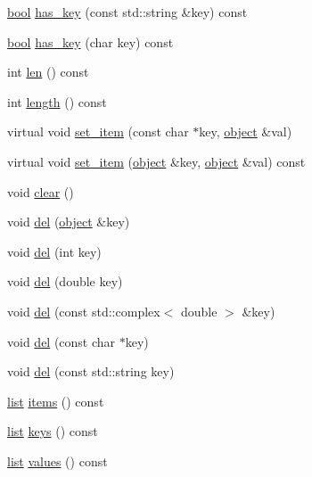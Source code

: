 \begin{DoxyCompactItemize}
\item 
\hyperlink{compiler_8h_abb452686968e48b67397da5f97445f5b}{bool} \hyperlink{classpy_1_1dict_a1e93fb561965cccdf7720a3069c008d0}{has\+\_\+key} (const std\+::string \&key) const 
\item 
\hyperlink{compiler_8h_abb452686968e48b67397da5f97445f5b}{bool} \hyperlink{classpy_1_1dict_a9a29698e309eaac8811f7fa0eb6f589d}{has\+\_\+key} (char key) const 
\item 
int \hyperlink{classpy_1_1dict_af1f58cca1f270397349855b84d4df5fc}{len} () const 
\item 
int \hyperlink{classpy_1_1dict_a7557aa3c212cf55ecac869823f912295}{length} () const 
\item 
virtual void \hyperlink{classpy_1_1dict_aa632b88577839a9cb10fa1625173df08}{set\+\_\+item} (const char $\ast$key, \hyperlink{classpy_1_1object}{object} \&val)
\item 
virtual void \hyperlink{classpy_1_1dict_a9c84f88fdc3f1c9b51ee6af4710aaf0f}{set\+\_\+item} (\hyperlink{classpy_1_1object}{object} \&key, \hyperlink{classpy_1_1object}{object} \&val) const 
\item 
void \hyperlink{classpy_1_1dict_ac25bf8117c03ba21e3a20d040215b419}{clear} ()
\item 
void \hyperlink{classpy_1_1dict_a4e78252d83960c47c4697fa6ceb05351}{del} (\hyperlink{classpy_1_1object}{object} \&key)
\item 
void \hyperlink{classpy_1_1dict_ae16a6626cbf8a367d3036a1bee641c62}{del} (int key)
\item 
void \hyperlink{classpy_1_1dict_a1c72f4f4540d12719ac2218bd75d5075}{del} (double key)
\item 
void \hyperlink{classpy_1_1dict_a99f7029e614e4680c45d3f4988e08be3}{del} (const std\+::complex$<$ double $>$ \&key)
\item 
void \hyperlink{classpy_1_1dict_a3f2e09cb7a2f8bfebc595479cbc4baf1}{del} (const char $\ast$key)
\item 
void \hyperlink{classpy_1_1dict_a996544ac1455c3dedf80a8ca6a75a67b}{del} (const std\+::string key)
\item 
\hyperlink{classpy_1_1list}{list} \hyperlink{classpy_1_1dict_ab9a94bb64ad3e10b17ec6281236222eb}{items} () const 
\item 
\hyperlink{classpy_1_1list}{list} \hyperlink{classpy_1_1dict_a805498ac65923f309d78793a740a30e6}{keys} () const 
\item 
\hyperlink{classpy_1_1list}{list} \hyperlink{classpy_1_1dict_a3b36406d0bbf881559f5f247cb201636}{values} () const 
\end{DoxyCompactItemize}
